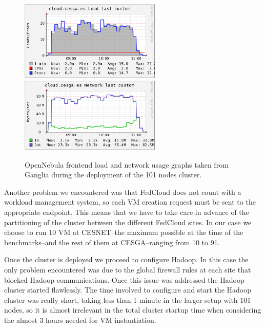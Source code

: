\documentclass[oribibl]{llncs_Ibergrid2013}
\begin{document}
\begin{figure}[t!]
\centering
\includegraphics[width=0.6\textwidth]{figures/ON_load-complete.png}
\includegraphics[width=0.6\textwidth]{figures/ON_network-complete.png}
\caption{OpenNebula frontend load and network usage graphs taken from Ganglia during the deployment of the 101 nodes cluster.}
\label{fig:on}
\end{figure}


Another problem we encountered was that FedCloud does not count with a workload management system, so each VM creation request must be sent to the appropriate endpoint. This means that we have to take care in advance of the partitioning of the cluster between the different FedCloud sites. In our case we choose to run 10 VM at CESNET--the maximum possible at the time of the benchmarks--and the rest of them at CESGA--ranging from 10 to 91.

Once the cluster is deployed we proceed to configure Hadoop. In this case the only problem encountered was due to the global firewall rules at each site that blocked Hadoop communications. Once this issue was addressed the Hadoop cluster started flawlessly. The time involved to configure and start the Hadoop cluster was really short, taking less than 1 minute in the larger setup with 101 nodes, so it is almost irrelevant in the total cluster startup time when considering the almost 3 hours needed for VM instantiation.

\end{document}
